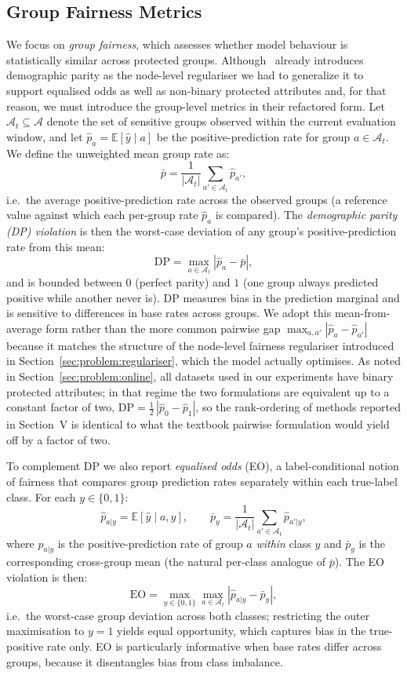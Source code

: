 \documentclass[sigconf,anonymous,review]{acmart}
\begin{document}
\subsection{Group Fairness Metrics}
We focus on \emph{group fairness}, which assesses whether model behaviour is statistically similar across protected groups. Although~\cite{chowdhury2024enhancing} already 
introduces demographic parity as the node-level regulariser we had to generalize it to support equalised odds as well as non-binary protected attributes and, for that reason,
we must introduce the group-level metrics in their refactored form.
Let $\mathcal{A}_t \subseteq \mathcal{A}$ denote the set
of sensitive groups observed within the current evaluation window, and let $\hat{p}_a = \mathbb{E}[\hat{y} \mid a]$ be the positive-prediction rate for group $a \in \mathcal{A}_t$.
We define the unweighted mean group rate as:
\[
\bar{p} = \frac{1}{|\mathcal{A}_t|}\sum_{a' \in \mathcal{A}_t}\hat{p}_{a'},
\]
i.e.\ the average positive-prediction rate across the observed groups (a reference value against which each per-group rate $\hat{p}_a$ is compared). The \emph{demographic parity
(DP) violation} is then the worst-case deviation of any group's positive-prediction rate from this mean:
\[
\mathrm{DP} = \max_{a \in \mathcal{A}_t}\left|\hat{p}_a - \bar{p}\right|,
\]
and is bounded between $0$ (perfect parity) and $1$ (one group always predicted positive while another never is). DP measures bias in the prediction marginal and is
sensitive to differences in base rates across groups. We adopt this mean-from-average form rather than the more common pairwise gap $\max_{a,a'}|\hat p_a - \hat p_{a'}|$
because it matches the structure of the node-level fairness regulariser introduced in Section~\ref{sec:problem:regulariser}, which the model actually optimises. As noted in
Section~\ref{sec:problem:online}, all datasets used in our experiments have binary protected attributes; in that regime the two formulations are equivalent up to a constant
factor of two, $\mathrm{DP} = \tfrac{1}{2}\,|\hat p_0 - \hat p_1|$, so the rank-ordering of methods reported in Section~V is identical to what the textbook pairwise
formulation would yield off by a factor of two.

To complement DP we also report \emph{equalised odds} (EO), a label-conditional notion of fairness that compares group prediction rates separately within each true-label
class. For each $y \in \{0,1\}$:
\[
\hat{p}_{a|y} = \mathbb{E}[\hat{y} \mid a, y], \qquad
\bar{p}_y = \frac{1}{|\mathcal{A}_t|}\sum_{a' \in \mathcal{A}_t}\hat{p}_{a'|y},
\]
where $\hat{p}_{a|y}$ is the positive-prediction rate of group $a$ \emph{within} class $y$ and $\bar{p}_y$ is the corresponding cross-group mean (the natural per-class
analogue of $\bar{p}$). The EO violation is then:
\[
\mathrm{EO} = \max_{y \in \{0,1\}} \max_{a \in \mathcal{A}_t}
\left|\hat{p}_{a|y} - \bar{p}_y\right|,
\]
i.e.\ the worst-case group deviation across both classes; restricting the outer maximisation to $y=1$ yields equal opportunity, which captures bias in the true-positive
rate only. EO is particularly informative when base rates differ across groups, because it disentangles bias from class imbalance.
\end{document}
